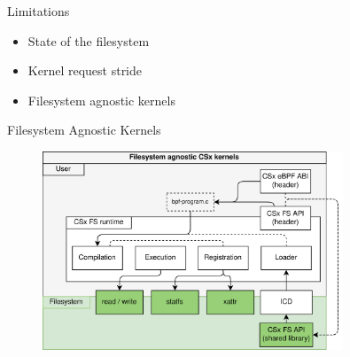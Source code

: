 \documentclass{beamer}
\begin{document}



\begin{frame}{Limitations}
	\begingroup
	\small
	\begin{itemize}
		\item State of the filesystem
		\item Kernel request stride
		\item Filesystem agnostic kernels
	\end{itemize}
	\endgroup
\end{frame}

\begin{frame}{Filesystem Agnostic Kernels}
	\begingroup
	\begin{figure}
		\centering
		\includegraphics[width=0.8\textwidth]{resources/images/csx-fs-agnostic.png}
	\end{figure}
	\endgroup
\end{frame}
\end{document}
